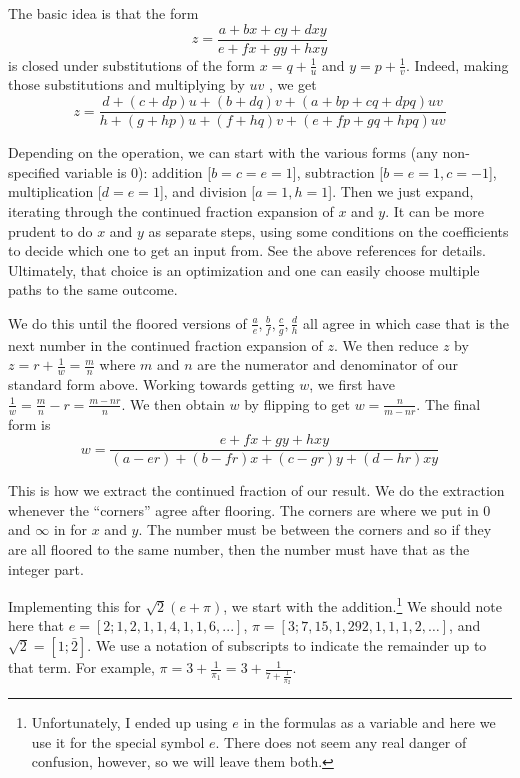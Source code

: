 \documentclass[12pt]{article}
\begin{document}
The basic idea is that the form $$z = \frac{a +bx + cy + dxy}{e + fx + gy + hxy}$$ is closed under substitutions of the form $x = q + \frac{1}{u}$ and $y = p + \frac{1}{v}$. Indeed, making those substitutions and multiplying by $uv$ , we get 
$$z = \frac{d + (c+d p) u + (b+dq)v + (a+bp + cq + dpq)uv}{h + (g+hp)u + (f+hq)v + (e+fp+ gq + hpq)uv}$$

Depending on the operation, we can start with the various forms (any non-specified variable is 0): addition [$b=c=e=1$], subtraction [$b=e=1, c=-1$], multiplication [$d=e=1$], and division [$a=1,h=1$]. Then we just expand, iterating through the continued fraction expansion of $x$ and $y$. It can be more prudent to do $x$ and $y$ as separate steps, using some conditions on the coefficients to decide which one to get an input from. See the above references for details. Ultimately, that choice is an optimization and one can easily choose multiple paths to the same outcome. 

We do this until the floored versions of $\frac{a}{e}, \frac{b}{f}, \frac{c}{g}, \frac{d}{h}$ all agree in which case that is the next number in the continued fraction expansion of $z$. We then reduce $z$ by $z = r + \frac{1}{w} = \frac{m}{n}$ where $m$ and $n$ are the numerator and denominator of our standard form above. Working towards getting $w$, we first have $\frac{1}{w} = \frac{m}{n} - r = \frac{m-nr}{n}$. We then obtain $w$ by flipping to get $w = \frac{n}{m-nr}$. The final form is 
$$w =  \frac{e + fx + gy + hxy}{(a-er) + (b-fr)x + (c-gr) y + (d-hr)xy}$$

This is how we extract the continued fraction of our result. We do the extraction whenever the ``corners'' agree after flooring. The corners are where we put in 0 and $\infty$ in for $x$ and $y$. The number must be between the corners and so if they are all floored to the same number, then the number must have that as the integer part.

Implementing this for $\sqrt{2}(e + \pi)$, we start with the addition.\footnote{Unfortunately, I ended up using $e$ in the formulas as a variable and here we use it for the special symbol $e$. There does not seem any real danger of confusion, however, so we will leave them both.} We should note here that $e = [2; 1, 2, 1, 1, 4, 1, 1, 6, ...]$, $\pi = [3; 7, 15, 1, 292, 1, 1, 1, 2, \ldots]$, and $\sqrt{2} = [1; \bar{2}]$. We use a notation of subscripts to indicate the remainder up to that term. For example, $\pi = 3 + \frac{1}{\pi_1} =  3 + \frac{1}{7 + \frac{1}{\pi_2}}$. 
\end{document}
